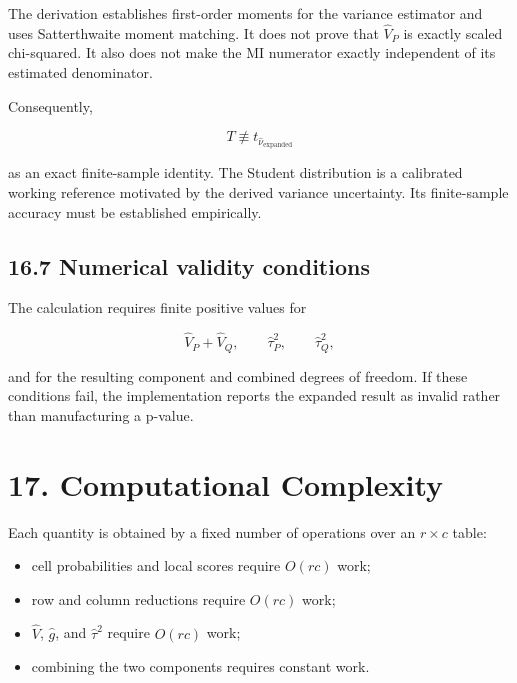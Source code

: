 \documentclass[
  11pt]{article}
\providecommand{\tightlist}{%
  \setlength{\itemsep}{0pt}\setlength{\parskip}{0pt}}
\let\originalsection\section
\renewcommand{\section}{\clearpage\originalsection}
\begin{document}
The derivation establishes first-order moments for the variance
estimator and uses Satterthwaite moment matching. It does not prove that
\(\widehat V_P\) is exactly scaled chi-squared. It also does not make
the MI numerator exactly independent of its estimated denominator.

Consequently,

\begin{equation}
T\not\equiv t_{\widehat\nu_{\mathrm{expanded}}}
\end{equation}

as an exact finite-sample identity. The Student distribution is a
calibrated working reference motivated by the derived variance
uncertainty. Its finite-sample accuracy must be established empirically.

\subsection{16.7 Numerical validity
conditions}\label{numerical-validity-conditions}

The calculation requires finite positive values for

\begin{equation}
\widehat V_P+\widehat V_Q,
\qquad
\widehat\tau_P^2,
\qquad
\widehat\tau_Q^2,
\end{equation}

and for the resulting component and combined degrees of freedom. If
these conditions fail, the implementation reports the expanded result as
invalid rather than manufacturing a p-value.

\section{17. Computational Complexity}\label{computational-complexity}

Each quantity is obtained by a fixed number of operations over an
\(r\times c\) table:

\begin{itemize}
\tightlist
\item
  cell probabilities and local scores require \(O(rc)\) work;
\item
  row and column reductions require \(O(rc)\) work;
\item
  \(\widehat V\), \(\widehat g\), and \(\widehat\tau^2\) require
  \(O(rc)\) work;
\item
  combining the two components requires constant work.
\end{itemize}
\end{document}
